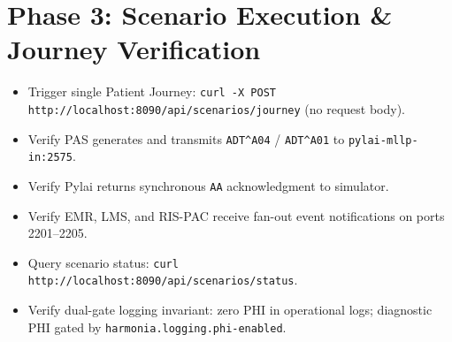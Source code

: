 \section{Phase 3: Scenario Execution \& Journey Verification}
\begin{itemize}[label=$\square$]
    \item Trigger single Patient Journey: \nolinkurl{curl -X POST http://localhost:8090/api/scenarios/journey} (no request body).
    \item Verify PAS generates and transmits \nolinkurl{ADT^A04} / \nolinkurl{ADT^A01} to \nolinkurl{pylai-mllp-in:2575}.
    \item Verify Pylai returns synchronous \nolinkurl{AA} acknowledgment to simulator.
    \item Verify EMR, LMS, and RIS-PAC receive fan-out event notifications on ports 2201--2205.
    \item Query scenario status: \nolinkurl{curl http://localhost:8090/api/scenarios/status}.
    \item Verify dual-gate logging invariant: zero PHI in operational logs; diagnostic PHI gated by \nolinkurl{harmonia.logging.phi-enabled}.
\end{itemize}

\newpage
